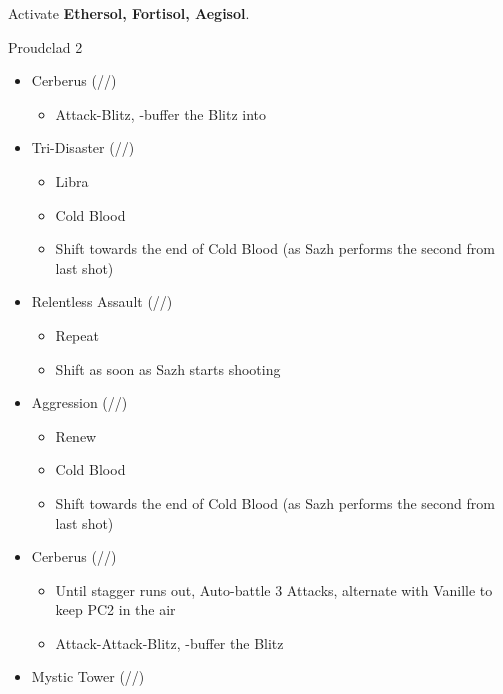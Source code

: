 Activate \textbf{Ethersol, Fortisol, Aegisol}.
\vfill
\renewcommand{\first}{[1] Aggression (\rav/\com/\com)}
\renewcommand{\second}{[2] Cerberus (\com/\com/\com)}
\renewcommand{\third}{[3] Mystic Tower (\rav/\sen/\rav)}
\renewcommand{\fourth}{[4] Tireless Charge (\com/\com/\med)}
\renewcommand{\fifth}{[5] Relentless Assault (\rav/\com/\rav)}
\renewcommand{\sixth}{[6] Tri-Disaster (\rav/\rav/\rav)}
\begin{battle}[2:03]{Proudclad 2}
		\begin{itemize}
			\item \second
			      \begin{itemize}
				      \item Attack-Blitz, \rav-buffer the Blitz into
			      \end{itemize}
			\item \sixth
			      \begin{itemize}
				      \item Libra
				      \item Cold Blood
				      \item Shift towards the end of Cold Blood (as Sazh performs the second from last shot)
			      \end{itemize}
			\item \fifth
			      \begin{itemize}
				      \item Repeat
				      \item Shift as soon as Sazh starts shooting
			      \end{itemize}
			\item \first
			      \begin{itemize}
			      	  \item Renew
				      \item Cold Blood
				      \item Shift towards the end of Cold Blood (as Sazh performs the second from last shot)
			      \end{itemize}
			\item \second
			      \begin{itemize}
				      \item Until stagger runs out, Auto-battle 3 Attacks, alternate with Vanille to keep PC2 in the air
				      \item Attack-Attack-Blitz, \rav-buffer the Blitz
			      \end{itemize}
			\item \third
			      \begin{itemize}

\end{itemize}
\end{itemize}
\end{battle}
